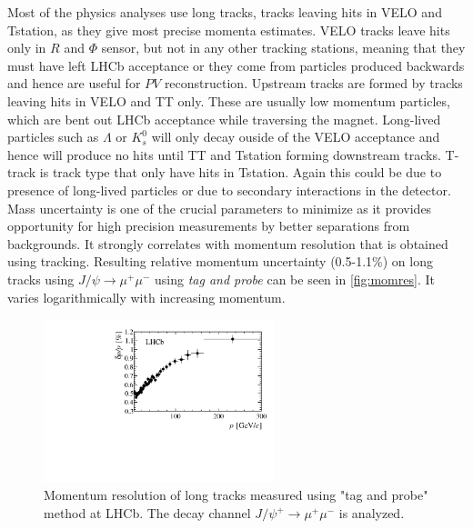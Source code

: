 
Most of the physics analyses use long tracks, tracks leaving hits in \Gls{VELO} and \Gls{Tstation}, as they give most precise momenta estimates.
VELO tracks leave hits only in $R$ and $\Phi$ sensor, but not in any other tracking stations, meaning that they must have left \Gls{LHCb} acceptance or they come from particles produced backwards and hence are useful for $PV$ reconstruction. Upstream tracks are formed by tracks leaving hits in \Gls{VELO} and TT only. These are usually low momentum particles, which are bent out \Gls{LHCb} acceptance while traversing the magnet. Long-lived particles such as $\Lambda$ or $K^{0}_{s}$ will only decay ouside of the \Gls{VELO} acceptance and hence will produce no hits until \Gls{TT} and \Gls{Tstation} forming downstream tracks. T-track is track type that only have hits in \Gls{Tstation}. Again this could be due to presence of long-lived particles or due to secondary interactions in the detector.   
Mass uncertainty is one of the crucial parameters to minimize as it provides opportunity for high precision measurements by better separations from backgrounds. It strongly correlates with momentum resolution that is obtained using tracking. Resulting relative momentum uncertainty (0.5-1.1\%) on long tracks using $J/\psi \rightarrow \mu^{+} \mu^{-}$ using \textit{tag and probe} can be seen in \autoref{fig:momres}. It varies logarithmically with increasing momentum.


\begin{figure}[!h]
	\centering
	\includegraphics[width = 0.6\textwidth]{figs/detector/momresolution.png}
	\caption{Momentum resolution of long tracks measured using "tag and probe" method at LHCb. The decay channel $J/\psi^{+} \rightarrow \mu^{+} \mu^{-}$ is analyzed.}
	\label{fig:momres}
\end{figure}

